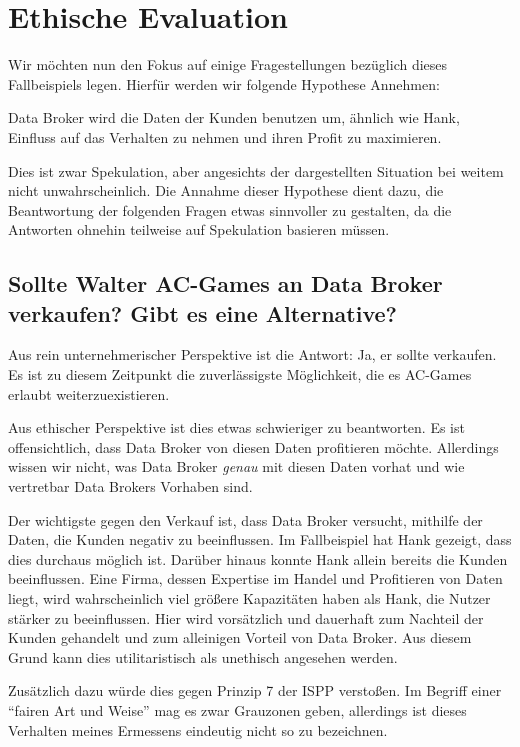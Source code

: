 \section{Ethische Evaluation}

Wir möchten nun den Fokus auf einige Fragestellungen bezüglich dieses Fallbeispiels legen. Hierfür werden wir folgende Hypothese Annehmen:

\begin{center}
\parbox{0.8\textwidth}{
    Data Broker wird die Daten der Kunden benutzen um, ähnlich wie Hank, Einfluss auf das Verhalten zu nehmen und ihren Profit zu maximieren. 
}
\end{center}

Dies ist zwar Spekulation, aber angesichts der dargestellten Situation bei weitem nicht unwahrscheinlich.
Die Annahme dieser Hypothese dient dazu, die Beantwortung der folgenden Fragen etwas sinnvoller zu gestalten, da die Antworten ohnehin teilweise auf Spekulation basieren müssen.

\subsection*{Sollte Walter AC-Games an Data Broker verkaufen? \cite{kees_faites_2017} Gibt es eine Alternative?}

Aus rein unternehmerischer Perspektive ist die Antwort: Ja, er sollte verkaufen.
Es ist zu diesem Zeitpunkt die zuverlässigste Möglichkeit, die es AC-Games erlaubt weiterzuexistieren.

Aus ethischer Perspektive ist dies etwas schwieriger zu beantworten.
Es ist offensichtlich, dass Data Broker von diesen Daten profitieren möchte.
Allerdings wissen wir nicht, was Data Broker \emph{genau} mit diesen Daten vorhat und wie vertretbar Data Brokers Vorhaben sind.

Der wichtigste gegen den Verkauf ist, dass Data Broker versucht, mithilfe der Daten, die Kunden negativ zu beeinflussen. 
Im Fallbeispiel hat Hank gezeigt, dass dies durchaus möglich ist.
Darüber hinaus konnte Hank allein bereits die Kunden beeinflussen.
Eine Firma, dessen Expertise im Handel und Profitieren von Daten liegt, wird wahrscheinlich viel größere Kapazitäten haben als Hank, die Nutzer stärker zu beeinflussen.
Hier wird vorsätzlich und dauerhaft zum Nachteil der Kunden gehandelt und zum alleinigen Vorteil von Data Broker. Aus diesem Grund kann dies utilitaristisch als unethisch angesehen werden.

Zusätzlich dazu würde dies gegen Prinzip 7 der ISPP verstoßen. Im Begriff einer \enquote{fairen Art und Weise} mag es zwar Grauzonen geben, allerdings ist dieses Verhalten meines Ermessens eindeutig nicht so zu bezeichnen.  


